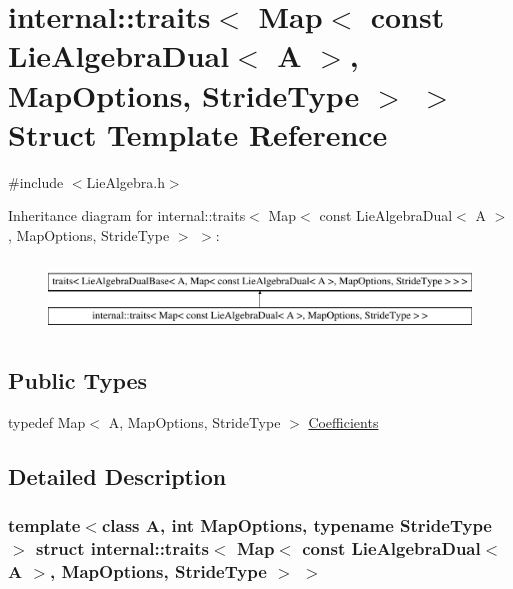\hypertarget{structinternal_1_1traits_3_01_map_3_01const_01_lie_algebra_dual_3_01_a_01_4_00_01_map_options_00_01_stride_type_01_4_01_4}{}\section{internal\+:\+:traits$<$ Map$<$ const Lie\+Algebra\+Dual$<$ A $>$, Map\+Options, Stride\+Type $>$ $>$ Struct Template Reference}
\label{structinternal_1_1traits_3_01_map_3_01const_01_lie_algebra_dual_3_01_a_01_4_00_01_map_options_00_01_stride_type_01_4_01_4}


{\ttfamily \#include $<$Lie\+Algebra.\+h$>$}

Inheritance diagram for internal\+:\+:traits$<$ Map$<$ const Lie\+Algebra\+Dual$<$ A $>$, Map\+Options, Stride\+Type $>$ $>$\+:\begin{figure}[H]
\begin{center}
\leavevmode
\includegraphics[height=1.927711cm]{structinternal_1_1traits_3_01_map_3_01const_01_lie_algebra_dual_3_01_a_01_4_00_01_map_options_00_01_stride_type_01_4_01_4}
\end{center}
\end{figure}
\subsection*{Public Types}
\begin{DoxyCompactItemize}
\item 
typedef Map$<$ A, Map\+Options, Stride\+Type $>$ \hyperlink{structinternal_1_1traits_3_01_map_3_01const_01_lie_algebra_dual_3_01_a_01_4_00_01_map_options_00_01_stride_type_01_4_01_4_a459b9a329ae5a1cbe01f3e0456c6eb70}{Coefficients}
\end{DoxyCompactItemize}


\subsection{Detailed Description}
\subsubsection*{template$<$class A, int Map\+Options, typename Stride\+Type$>$\newline
struct internal\+::traits$<$ Map$<$ const Lie\+Algebra\+Dual$<$ A $>$, Map\+Options, Stride\+Type $>$ $>$}



